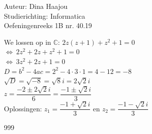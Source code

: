 \documentclass[a4paper]{article}
\begin{document}
\noindent \large Auteur: Dina Haajou \\
\noindent \large Studierichting: Informatica \\
\noindent \large Oefeningenreeks 1B nr. 40.19 \\

\normalsize

We lossen op in $\mathbb{C}$: $2z(z + 1) + z^2 + 1 = 0$ \\

$\Leftrightarrow\ 2z^2 + 2z + z^2 + 1 = 0$ \\

$\Leftrightarrow\ 3z^2 + 2z + 1 = 0$ \\

$D = b^2 - 4ac = 2^2 - 4 \cdot 3 \cdot 1 = 4 - 12 = -8$ \\

$\sqrt{D} = \sqrt{-8} = \sqrt{8}i = 2\sqrt{2}i$ \\

$z = \dfrac{-2 \pm 2\sqrt{2}i}{6} = \dfrac{-1 \pm \sqrt{2}i}{3}$ \\

Oplossingen: $z_1 = \dfrac{-1 + \sqrt{2}i}{3}$ en $z_2 = \dfrac{-1 - \sqrt{2}i}{3}$ \\

\begin{thebibliography}{999}
\end{thebibliography}
\end{document}
